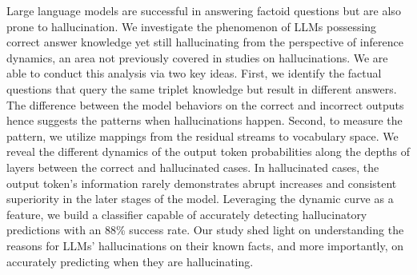 Large language models are successful in answering factoid questions but are also prone to hallucination. We investigate the phenomenon of LLMs possessing correct answer knowledge yet still hallucinating from the perspective of inference dynamics, an area not previously covered in studies on hallucinations. We are able to conduct this analysis via two key ideas. First, we identify the factual questions that query the same triplet knowledge but result in different answers. The difference between the model behaviors on the correct and incorrect outputs hence suggests the patterns when hallucinations happen. Second, to measure the pattern, we utilize mappings from the residual streams to vocabulary space. We reveal the different dynamics of the output token probabilities along the depths of layers between the correct and hallucinated cases.  In hallucinated cases, the output token's information rarely demonstrates abrupt increases and consistent superiority in the later stages of the model. Leveraging the dynamic curve as a feature, we build a classifier capable of accurately detecting hallucinatory predictions with an 88\% success rate.  Our study shed light on understanding the reasons for LLMs' hallucinations on their known facts, and more importantly, on accurately predicting when they are hallucinating.